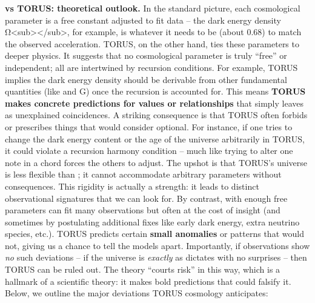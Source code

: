 \documentclass[
]{article}
\begin{document}
\textbf{\LambdaCDM vs TORUS: theoretical outlook.} In the standard picture,
each cosmological parameter is a free constant adjusted to fit data --
the dark energy density
Ω\textless sub\textgreater \Lambda\textless/sub\textgreater, for example, is
whatever it needs to be (about 0.68) to match the observed acceleration.
TORUS, on the other hand, ties these parameters to deeper physics. It
suggests that no cosmological parameter is truly ``free'' or
independent; all are intertwined by recursion conditions. For example,
TORUS implies the dark energy density should be derivable from other
fundamental quantities (like \alpha and G) once the recursion is accounted
for\hspace{0pt}. This means \textbf{TORUS makes concrete predictions for
values or relationships} that \LambdaCDM simply leaves as unexplained
coincidences. A striking consequence is that TORUS often forbids or
prescribes things that \LambdaCDM would consider optional. For instance, if
one tries to change the dark energy content or the age of the universe
arbitrarily in TORUS, it could violate a recursion harmony condition --
much like trying to alter one note in a chord forces the others to
adjust. The upshot is that TORUS's universe is less flexible than \LambdaCDM;
it cannot accommodate arbitrary parameters without consequences. This
rigidity is actually a strength: it leads to distinct observational
signatures that we can look for. By contrast, \LambdaCDM with enough free
parameters can fit many observations but often at the cost of insight
(and sometimes by postulating additional fixes like early dark energy,
extra neutrino species, etc.). TORUS predicts certain \textbf{small
anomalies} or patterns that \LambdaCDM would not, giving us a chance to tell
the models apart. Importantly, if observations show \emph{no} such
deviations -- if the universe is \emph{exactly} as \LambdaCDM dictates with no
surprises -- then TORUS can be ruled out. The theory ``courts risk'' in
this way\hspace{0pt}, which is a hallmark of a scientific theory: it
makes bold predictions that could falsify it. Below, we outline the
major deviations TORUS cosmology anticipates:
\end{document}
